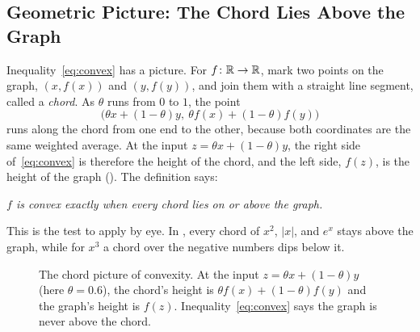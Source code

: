 \subsection{Geometric Picture: The Chord Lies Above the Graph}
\label{sec:ch01-chord}

Inequality~\eqref{eq:convex} has a picture. For $f\colon \mathbb{R} \to \mathbb{R}$, mark
two points on the graph, $(x, f(x))$ and $(y, f(y))$, and join them with a
straight line segment, called a \emph{chord}. As $\theta$ runs from $0$ to
$1$, the point
\[
  \bigl(\theta x + (1 - \theta) y,\ \theta f(x) + (1 - \theta) f(y)\bigr)
\]
runs along the chord from one end to the other, because both coordinates
are the same weighted average. At the input
$z = \theta x + (1 - \theta) y$, the right side of~\eqref{eq:convex} is
therefore the height of the chord, and the left side, $f(z)$, is the
height of the graph (). The definition says:
\begin{center}
  \emph{$f$ is convex exactly when every chord lies on or above the graph.}
\end{center}
This is the test to apply by eye. In , every
chord of $x^2$, $|x|$, and $e^x$ stays above the graph, while for $x^3$ a
chord over the negative numbers dips below it.

\begin{figure}[ht]
  \centering
  \caption{The chord picture of convexity. At the input
    $z = \theta x + (1 - \theta) y$ (here $\theta = 0.6$), the chord's
    height is $\theta f(x) + (1 - \theta) f(y)$ and the graph's height is
    $f(z)$. Inequality~\eqref{eq:convex} says the graph is never above the
    chord.}
  \label{fig:ch01-chord}
\end{figure}

